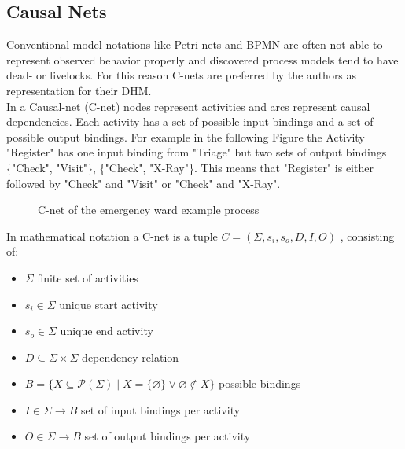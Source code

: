 \subsection{Causal Nets}
Conventional model notations like Petri nets and BPMN are often not able to represent observed behavior properly and discovered process models tend to have dead- or livelocks. For this reason C-nets are preferred by the authors as representation for their DHM.\\
In a Causal-net (C-net) nodes represent activities and arcs represent causal dependencies. Each activity has a set of possible input bindings and a set of possible output bindings. For example in the following Figure the Activity "Register" has one input binding from "Triage" but two sets of output bindings \{"Check", "Visit"\}, \{"Check", "X-Ray"\}. This means that "Register" is either followed by "Check" and "Visit" or "Check" and "X-Ray".\protect\cite{Mannhardt17}\protect\cite{Aalst}

\begin{figure} [H]
\caption{C-net of the emergency ward example process\protect\cite{Mannhardt17}\protect\cite{VanDerAlst11}} 
\end{figure}
\vspace{3pt}

\noindent In mathematical notation a C-net is a tuple $C = (\Sigma, s_i , s_o , D, I, O)$ , consisting of:
\begin{itemize}
\setlength{\itemsep}{2pt}
\item{$\Sigma$ finite set of activities}
\item{$s_i \in \Sigma$ unique start activity}
\item{$s_o \in \Sigma$ unique end activity}
\item{$D \subseteq \Sigma \times \Sigma$ dependency relation}
\item{$B = \{X \subseteq \mathscr{P} (\Sigma) \; \rvert \; X = \{ \varnothing \} \vee \varnothing \notin X \} $ possible bindings}
\item{$I \in \Sigma \rightarrow B$ set of input bindings per activity}
\item{$O \in \Sigma \rightarrow B$ set of output bindings per activity}\\
\protect\cite{Mannhardt17}
\end{itemize}



